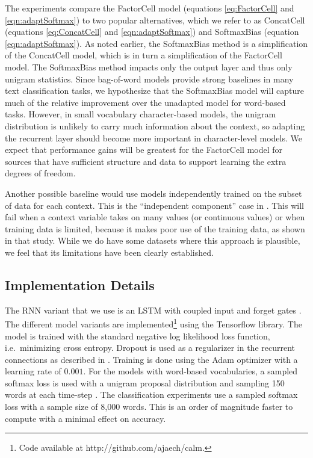 The experiments compare the FactorCell model (equations \ref{eq:FactorCell} and \ref{eqn:adaptSoftmax}) to two popular alternatives, which we refer to as ConcatCell (equations \ref{eq:ConcatCell} and \ref{eqn:adaptSoftmax}) and SoftmaxBias (equation \ref{eqn:adaptSoftmax}). As noted earlier, the SoftmaxBias method is a simplification of the ConcatCell model, which is in turn a simplification of the FactorCell model. The SoftmaxBias method impacts only the output layer and thus only unigram statistics. 
Since bag-of-word models provide strong baselines in many text classification tasks, we hypothesize that the SoftmaxBias model will capture much of the relative improvement over the unadapted model for word-based tasks. However, in small vocabulary character-based models, the unigram distribution is unlikely to carry much information about the context, so adapting the recurrent layer should become more important in character-level models. 
We expect that performance gains will be greatest for the FactorCell model for sources that have sufficient structure and data to support learning the extra degrees of freedom.

Another possible baseline would use models independently trained on the subset of data for each context. This is the ``independent component'' case in \cite{Yogatama2017GenerativeAD}. This will fail when a context variable takes on many values (or continuous values) or when training data is limited, because it makes poor use of the training data, as shown in that study. While we do have some datasets where this approach is plausible, we feel that its limitations have been clearly established.

\subsection{Implementation Details}
The RNN variant that we use is an LSTM with coupled input and forget gates \cite{melis2017state}.  The different model variants are implemented\footnote{Code available at http://github.com/ajaech/calm.} using the Tensorflow library. 
The model is trained with the standard negative log likelihood loss function, i.e.\ minimizing cross entropy.
Dropout is used as a regularizer in the recurrent connections as described in . Training is done using the Adam optimizer with a learning rate of $0.001$. For the models with word-based vocabularies, a sampled softmax loss is used with a unigram proposal distribution and sampling 150 words at each time-step \cite{jean2014using}. The classification experiments use a sampled softmax loss with a sample size of 8,000 words. This is an order of magnitude faster to compute with a minimal effect on accuracy.

